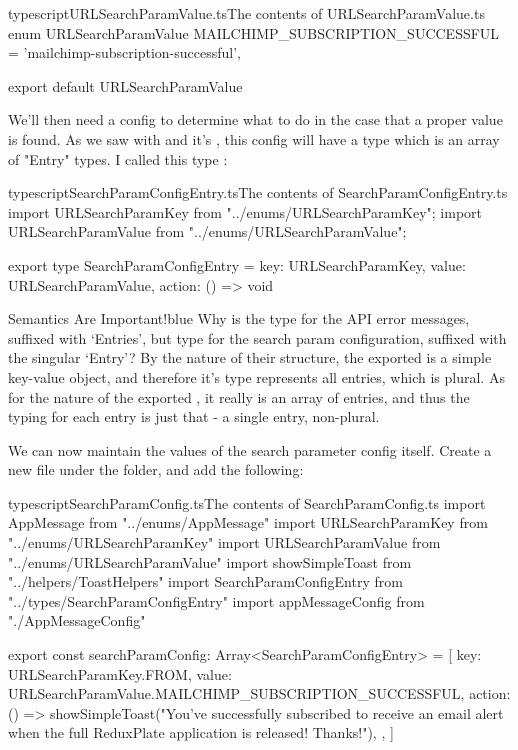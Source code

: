 \documentclass[a4paper,headinclude=on,footinclude=on,12pt,oneside]{scrbook}
\begin{document}
\begin{codeInput}{typescript}{URLSearchParamValue.ts}{The contents of URLSearchParamValue.ts}
enum URLSearchParamValue {
  MAILCHIMP_SUBSCRIPTION_SUCCESSFUL = 'mailchimp-subscription-successful',
}

export default URLSearchParamValue  
\end{codeInput}

We'll then need a config to determine what to do in the case that a proper value is found. As we saw with  and it's , this config will have a type which is an array of "Entry" types. I called this  type :

\begin{codeInput}{typescript}{SearchParamConfigEntry.ts}{The contents of SearchParamConfigEntry.ts}
import URLSearchParamKey from "../enums/URLSearchParamKey";
import URLSearchParamValue from "../enums/URLSearchParamValue";

export type SearchParamConfigEntry = {
    key: URLSearchParamKey,
    value: URLSearchParamValue,
    action: () => void
}
\end{codeInput}

\begin{highlightBox}{Semantics Are Important!}{blue}{\information}
Why is the type for the API error messages,  suffixed with `Entries', but type for the search param configuration,  suffixed with the singular `Entry'? By the nature of their structure, the exported  is a simple key-value object, and therefore it's type represents all entries, which is plural. As for the nature of the exported , it really is an array of entries, and thus the typing for each entry is just that - a single entry, non-plural.
\end{highlightBox}

We can now maintain the values of the search parameter config itself. Create a new file  under the  folder, and add the following:

\begin{codeInput}{typescript}{SearchParamConfig.ts}{The contents of SearchParamConfig.ts}
import AppMessage from "../enums/AppMessage"
import URLSearchParamKey from "../enums/URLSearchParamKey"
import URLSearchParamValue from "../enums/URLSearchParamValue"
import { showSimpleToast } from "../helpers/ToastHelpers"
import { SearchParamConfigEntry } from "../types/SearchParamConfigEntry"
import { appMessageConfig } from "./AppMessageConfig"

export const searchParamConfig: Array<SearchParamConfigEntry> = [
  {
    key: URLSearchParamKey.FROM,
    value: URLSearchParamValue.MAILCHIMP_SUBSCRIPTION_SUCCESSFUL,
    action: () =>
      showSimpleToast("You've successfully subscribed to receive an email alert when the full ReduxPlate application is released! Thanks!"),
  },
]  
\end{codeInput}
\end{document}
